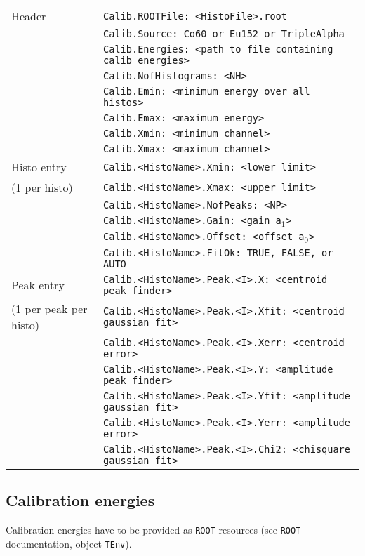 \documentclass[10pt]{article}
\begin{document}
\begin{center}
\begin{tabular}{|l|l|}
\hline
Header	&	\texttt{Calib.ROOTFile: <HistoFile>.root}		\\
	&	\texttt{Calib.Source: Co60 or Eu152 or TripleAlpha}		\\
	&	\texttt{Calib.Energies: <path to file containing calib energies>}		\\
	&	\texttt{Calib.NofHistograms: <NH>}		\\
	&	\texttt{Calib.Emin: <minimum energy over all histos>}		\\
	&	\texttt{Calib.Emax: <maximum energy>}		\\
	&	\texttt{Calib.Xmin: <minimum channel>}		\\
	&	\texttt{Calib.Xmax: <maximum channel>}		\\
\hline
Histo entry	&	\texttt{Calib.<HistoName>.Xmin:	<lower limit>}	\\
(1 per histo) &	\texttt{Calib.<HistoName>.Xmax:	<upper limit>}	\\
	&	\texttt{Calib.<HistoName>.NofPeaks: <NP>}	\\
	&	\texttt{Calib.<HistoName>.Gain: <gain a$_1$>}	\\
	&	\texttt{Calib.<HistoName>.Offset: <offset a$_0$>}	\\
	&	\texttt{Calib.<HistoName>.FitOk: TRUE, FALSE, or AUTO}	\\
\hline
Peak entry	&	\texttt{Calib.<HistoName>.Peak.<I>.X:	<centroid peak finder>}	\\
(1 per peak per histo) &	\texttt{Calib.<HistoName>.Peak.<I>.Xfit:	<centroid gaussian fit>}	\\
	&	\texttt{Calib.<HistoName>.Peak.<I>.Xerr:	<centroid error>}	\\
	&	\texttt{Calib.<HistoName>.Peak.<I>.Y:	<amplitude peak finder>}	\\
	&	\texttt{Calib.<HistoName>.Peak.<I>.Yfit:	<amplitude gaussian fit>}	\\
	&	\texttt{Calib.<HistoName>.Peak.<I>.Yerr:	<amplitude error>}	\\
	&	\texttt{Calib.<HistoName>.Peak.<I>.Chi2:	<chisquare gaussian fit>}	\\
\hline
\end{tabular}
\end{center}
\subsection{Calibration energies}\label{EngFileFormat}
Calibration energies have to be provided as \texttt{ROOT} resources (see \texttt{ROOT} documentation, object \texttt{TEnv}).
\end{document}
